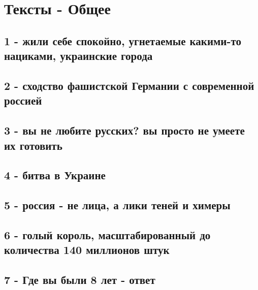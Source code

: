  
 
 
 
 

\section{Тексты - Общее}

\subsection{1 - жили себе спокойно, угнетаемые какими-то нациками, украинские города}

\subsection{2 - сходство фашистской Германии с современной россией}

\subsection{3 - вы не любите русских? вы просто не умеете их готовить}

\subsection{4 - битва в Украине}

\subsection{5 - россия - не лица, а лики теней и химеры}

\subsection{6 - голый король, масштабированный до количества 140 миллионов штук}

\subsection{7 - Где вы были 8 лет - ответ}


